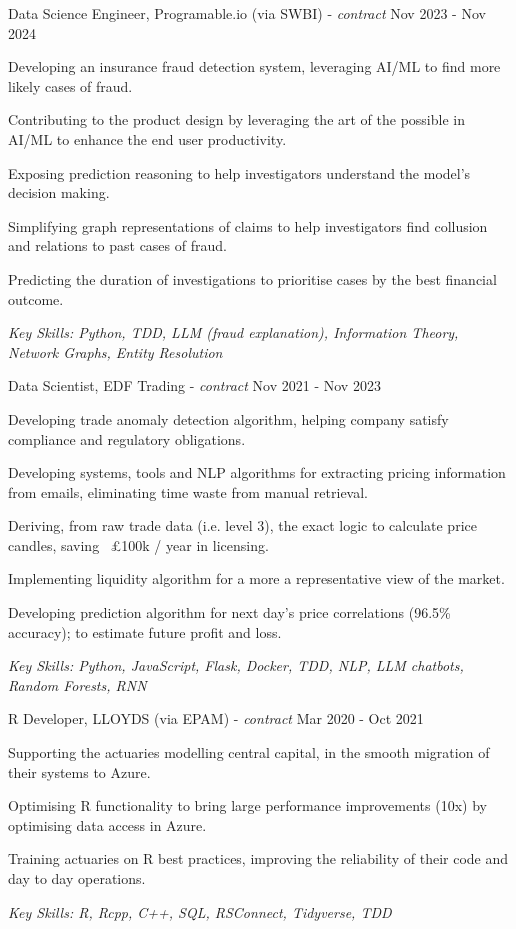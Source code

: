 \documentclass[11pt,article,oneside]{memoir}
\newenvironment{itemize*}{%
  \renewcommand\labelitemi{\textbullet}
  \footnotesize
  \begin{itemize}%
    \setlength{\itemsep}{0pt}}%
  {\end{itemize}
}
\begin{document}
\normalsize
\medskip
\ind Data Science Engineer, Programable.io (via SWBI) - \emph{contract} \hfill Nov 2023 - Nov 2024
\begin{itemize*}
    \item Developing an insurance fraud detection system, leveraging AI/ML to find more likely cases of fraud.
    \item Contributing to the product design by leveraging the art of the possible in AI/ML to enhance the end user productivity.
    \item Exposing prediction reasoning to help investigators understand the model's decision making.
    \item Simplifying graph representations of claims to help investigators find collusion and relations to past cases of fraud. 
    \item Predicting the duration of investigations to prioritise cases by the best financial outcome.
\end{itemize*}
\ind \hspace{0.35in} \footnotesize \emph{Key Skills: Python, TDD, LLM (fraud explanation), Information Theory, Network Graphs, Entity Resolution}

\normalsize
\medskip
\ind Data Scientist, EDF Trading - \emph{contract} \hfill Nov 2021 - Nov 2023
\begin{itemize*}
    \item Developing trade anomaly detection algorithm, helping company satisfy compliance and regulatory obligations.
    \item Developing systems, tools and NLP algorithms for extracting pricing information from emails, eliminating time waste from manual retrieval. 
    \item Deriving, from raw trade data (i.e. level 3), the exact logic to calculate price candles, saving ~£100k / year in licensing.
    \item Implementing liquidity algorithm for a more a representative view of the market.
    \item Developing prediction algorithm for next day's price correlations (96.5\% accuracy); to estimate future profit and loss. 
\end{itemize*}
\ind \hspace{0.35in} \footnotesize \emph{Key Skills: Python, JavaScript, Flask, Docker, TDD, NLP, LLM chatbots, Random Forests, RNN}

\normalsize
\medskip
\ind R Developer, LLOYDS (via EPAM) - \emph{contract} \hfill Mar 2020 - Oct 2021
\begin{itemize*}
    \item Supporting the actuaries modelling central capital, in the smooth migration of their systems to Azure.
    \item Optimising R functionality to bring large performance improvements (10x) by optimising data access in Azure. 
    \item Training actuaries on R best practices, improving the reliability of their code and day to day operations.
\end{itemize*}
\ind \hspace{0.35in} \footnotesize \emph{Key Skills: R, Rcpp, C++, SQL, RSConnect, Tidyverse, TDD}
\end{document}
